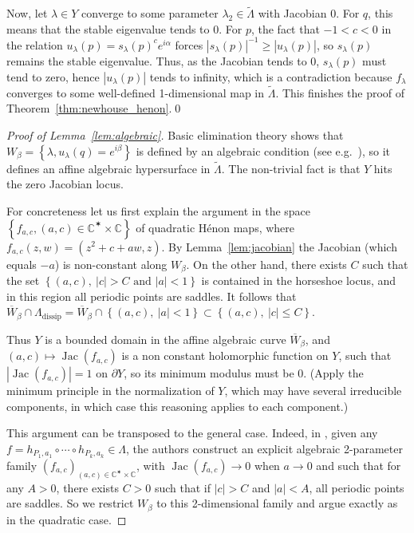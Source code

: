 \documentclass[11pt, oneside]{amsart}
\newcommand{\C}{\mathbb{C}}
\newcommand{\fr}{\partial}
\newcommand{\set}[1]{\left\{#1\right\}}
\newcommand{\abs}[1]{\left\vert#1\right\vert}
\newcommand{\la}{\lambda}
\newcommand{\inv}{^{-1}}
\DeclareMathOperator{\jac}{Jac}
\theoremstyle{remark}
\theoremstyle{definition}
\theoremstyle{theorem}
\newcommand{\commentaire}[1]{}
\begin{document}
Now, let $\lambda \in Y$ converge 
to some parameter $\la_2\in \widetilde \Lambda$  
with Jacobian 0. For $q$, this means that the stable eigenvalue tends to 0. For $p$,   the
fact that $-1<c<0$ in the  relation   $u_\la (p) = s_\la (p)^c e^{i\alpha}$ forces 
$\abs{s_\la(p)}\inv \geq \abs{u_\la(p)}$, so $s_\la(p)$ remains the stable eigenvalue. 
Thus, as the Jacobian tends to 0, $s_\la(p)$ 
must tend to  zero, hence $\abs{u_\la(p)}$ tends to infinity, which is a contradiction 
because $f_\la$ converges to some well-defined 1-dimensional map in $\widetilde \Lambda$. 
This finishes the proof of Theorem~\ref{thm:newhouse_henon}.\qed

\begin{proof}[Proof of Lemma~\ref{lem:algebraic}]
Basic elimination theory shows that 
 $W_\beta= \set{\lambda,   u_{\lambda}(q) = e^{i\beta}}$ is defined by an algebraic condition (see e.g.~\cite[\S 2.3]{BHI}), so it 
defines an  affine algebraic hypersurface 
 in $\widetilde \Lambda$. The non-trivial fact is that 
$Y$  hits the zero Jacobian locus. 

For concreteness let us first explain the argument in
the space $\set{f_{a, c}, (a, c)\in \C^\varstar\times \C}$ of quadratic Hénon maps, where 
$f_{a,c}(z,w)  = (z^2 + c  + aw, z)$. By Lemma~\ref{lem:jacobian} 
the Jacobian (which equals  $-a$) 
is non-constant along $W_\beta$.  On the other hand, there exists 
$C$ such that the set $\set{(a, c), \  \abs{c}>C \text{ and }
\abs{a}<1}$ is contained in the horseshoe locus, and in this region 
 all periodic points are saddles.  
It follows that $\overline W_\beta\cap   \Lambda_{\mathrm {dissip}} = 
\overline W_\beta\cap \set{(a, c), \ \abs{a}<1}\subset\set{(a, c), \ \abs{c}\leq C}$. 
\commentaire{Major remark \#4, continued}
Thus $Y$ is a bounded domain in the affine algebraic curve $\overline W_\beta$, and 
$(a,c)\mapsto \jac(f_{a,c})$ is a non constant holomorphic function on $Y$, such that 
$\abs{\jac(f_{a,c})}=1$ on $\fr Y$, so its 
minimum  modulus must be 0.   (Apply the minimum principle in the normalization of $Y$, 
which  may have several irreducible components, in which case this reasoning applies to  each component.)




This argument can be transposed to the general case. 
Indeed, in \cite[Prop. 5.1]{BHI}, given 
any $f  = h_{P_1, a_1}\circ \cdots \circ  h_{P_k, a_k}\in \Lambda$, 
the authors construct an explicit algebraic 
 2-parameter family $(f_{a, c})_{(a, c)\in \C^\varstar\times \C} $, 
with $\jac (f_{a,c})\to 0$ when $a\to 0$ and such that for any $A>0$,
there exists $C>0$ such that if 
$\abs{c}>C$ and $\abs{a}<A$, all periodic points are saddles. 
So we restrict $W_\beta$ to this 2-dimensional family and argue exactly as in the quadratic case. 
\end{proof}
\end{document}
